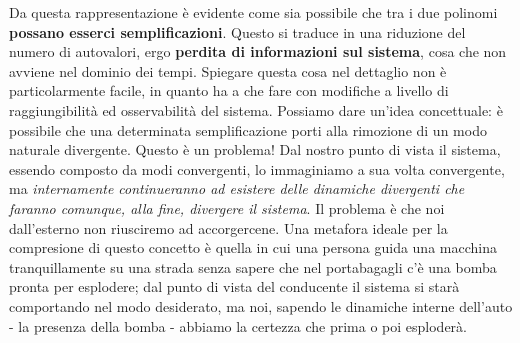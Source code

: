 Da questa rappresentazione è evidente come sia possibile che tra i due polinomi  \textbf{possano esserci semplificazioni}. Questo si traduce in una riduzione del numero di autovalori, ergo  \textbf{perdita di informazioni sul sistema}, cosa che non avviene nel dominio dei tempi. Spiegare questa cosa nel dettaglio non è particolarmente facile, in quanto ha a che fare con modifiche a livello di raggiungibilità ed osservabilità del sistema. Possiamo dare un'idea concettuale: è possibile che una determinata semplificazione porti alla rimozione di un modo naturale divergente. Questo è un problema! Dal nostro punto di vista il sistema, essendo composto da modi convergenti, lo immaginiamo a sua volta convergente, ma \textit{internamente continueranno ad esistere delle dinamiche divergenti che faranno comunque, alla fine, divergere il sistema}. Il problema è che noi dall'esterno non riusciremo ad accorgercene. Una metafora ideale per la compresione di questo concetto è quella in cui una persona guida una macchina tranquillamente su una strada senza sapere che nel portabagagli c'è una bomba pronta per esplodere; dal punto di vista del conducente il sistema si starà comportando nel modo desiderato, ma noi, sapendo le dinamiche interne dell'auto - la presenza della bomba - abbiamo la certezza che prima o poi esploderà.

